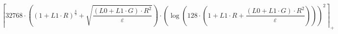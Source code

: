 \[\left\lceil 32768 \cdot \left(\left(1 + L1 \cdot R\right)^{\frac{4}{3}} + \sqrt{\frac{\left(L0 + L1 \cdot G\right) \cdot R^{2}}{\varepsilon}}\right) \cdot \left(\log\left(128 \cdot \left(1 + L1 \cdot R + \frac{\left(L0 + L1 \cdot G\right) \cdot R^{2}}{\varepsilon}\right)\right)\right)^{2} \right\rceil_{+}\]
